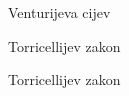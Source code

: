 \documentclass[croatian]{beamer}
\begin{document}
\begin{frame}{Venturijeva cijev}

\begin{figure}
\end{figure}
\end{frame}

\begin{frame}{Torricellijev zakon}

\begin{figure}
\end{figure}
\end{frame}

\begin{frame}{Torricellijev zakon}

\begin{figure}
\end{figure}
\end{frame}
\end{document}

